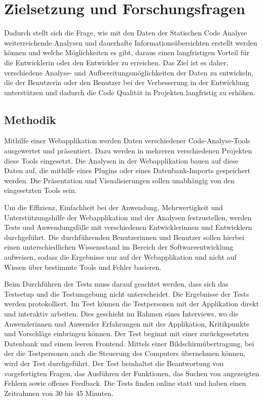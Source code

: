 \section{Zielsetzung und Forschungsfragen}

Dadurch stellt sich die Frage, wie mit den Daten der Statischen Code Analyse weiterreichende Analysen und dauerhafte Informationsübersichten erstellt werden können und welche Möglichkeiten es gibt, daraus einen langfristigen Vorteil für die Entwicklerin oder den Entwickler zu erreichen. Das Ziel ist es daher, verschiedene Analyse- und Aufbereitungsmöglichkeiten der Daten zu entwickeln, die der Benutzerin oder den Benutzer bei der Verbesserung in der Entwicklung unterstützen und dadurch die Code Qualität in Projekten langfristig zu erhöhen.

\subsection{Methodik} 

Mithilfe einer Webapplikation werden Daten verschiedener Code-Analyse-Tools ausgewertet und präsentiert. Dazu werden in mehreren verschiedenen Projekten diese Tools eingesetzt. Die Analysen in der Webapplikation bauen auf diese Daten auf, die mithilfe eines Plugins oder eines Datenbank-Imports gespeichert werden. Die Präsentation und Visualisierungen sollen unabhängig von den eingesetzten Tools sein.

Um die Effizienz, Einfachheit bei der Anwendung, Mehrwertigkeit und Unterstützungshilfe der Webapplikation und der Analysen festzustellen, werden Tests und Anwendungsfälle mit verschiedenen Entwicklerinnen und Entwicklern durchgeführt. Die durchführenden Benutzerinnen und Benutzer sollen hierbei einen unterschiedlichen Wissensstand im Bereich der Softwareentwicklung aufweisen, sodass die Ergebnisse nur auf der Webapplikation und nicht auf Wissen über bestimmte Tools und Fehler basieren. 


Beim Durchführen der Tests muss darauf geachtet werden, dass sich das Testsetup und die Testumgebung nicht unterscheidet. Die Ergebnisse der Tests werden protokolliert. Im Test können die Testpersonen mit der Applikation direkt und interaktiv arbeiten. Dies geschieht im Rahmen eines Interviews, wo die Anwenderinnen und Anwender Erfahrungen mit der Applikation, Kritikpunkte und Vorschläge einbringen können. Der Test beginnt mit einer zurückgesetzten Datenbank und einem leeren Frontend. Mittels einer Bildschirmübertragung, bei der die Testpersonen auch die Steuerung des Computers übernehmen können, wird der Test durchgeführt.
Der Test beinhaltet die Beantwortung von vorgefertigten Fragen, das Ausführen der Funktionen, das Suchen von angezeigten Fehlern sowie offenes Feedback.
Die Tests finden online statt und haben einen Zeitrahmen von 30 bis 45 Minuten. 
